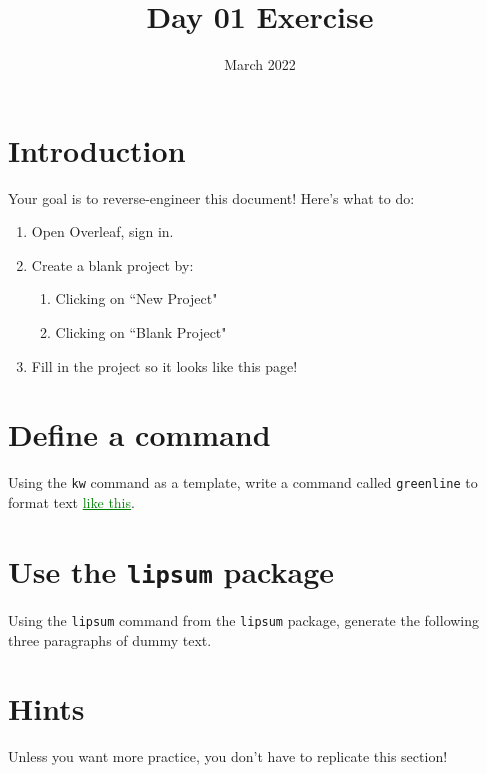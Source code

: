 \documentclass[twocolumn]{article}
\title{Day 01 Exercise}
\date{March 2022}
\newcommand\greenline[1]{\textcolor{green}{\underline{#1}}}
\begin{document}
    
\maketitle

\section{Introduction} \label{sec:intro}

Your goal is to reverse-engineer this document! Here's what to do:

\begin{enumerate}
    \item Open Overleaf, sign in.
    \item Create a blank project by:
    \begin{enumerate}
        \item Clicking on ``New Project" 
        \item Clicking on ``Blank Project"
    \end{enumerate}
    \item Fill in the project so it looks like this page!
\end{enumerate}

\section{Define a command} \label{sec:command}

Using the \texttt{kw} command as a template, write a command called \texttt{greenline} to format text \greenline{like this}.

\section{Use the \texttt{lipsum} package} \label{sec:package}

Using the \texttt{lipsum} command from the \texttt{lipsum} package, generate the following three paragraphs of dummy text.

\lipsum[1-3]

\section{Hints}

Unless you want more practice, you don't have to replicate this section!
\end{document}
